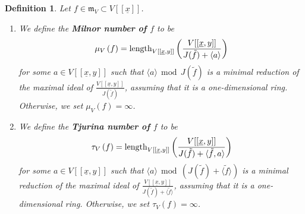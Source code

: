 \documentclass{article}
\newtheorem{definition}[theorem]{Definition}
\newcommand{\maxV}{\mathfrak{m}_V}
\newcommand{\Vx}{V[[\underline{x}]]}
\newcommand{\Vxy}{V[[\underline{x},y]]}
\numberwithin{theorem}{section}
\renewcommand{\mod}{\,\operatorname{mod}\,}
\begin{document}
\begin{definition}\label{def:tjurinaV}
    Let $f \in \maxV \subset \Vx$. 
    \begin{enumerate}
        \item We define the \textbf{Milnor number of $f$} to be
        \begin{equation*}
            \mu_V\left(f\right)=\textup{length}_{\Vxy}\left(\frac{\Vxy}{J(\tilde{f}) + \langle a \rangle}\right)
        \end{equation*}
        for some $a \in \Vxy$ such that $ \langle a\rangle \mod     J(\tilde{f})$ is a minimal reduction of the maximal ideal of $\frac{\Vxy}{J(\tilde{f})}$, assuming that it is a one-dimensional ring. Otherwise, we set $\mu_V\left(f\right)=\infty$. 
        \item We define the \textbf{Tjurina number of $f$} to be
        \begin{equation*}
            \tau_V\left(f\right)=\textup{length}_{\Vxy}\left(\frac{\Vxy}{J(\tilde{f}) + \langle \tilde{f},  a \rangle}\right)
        \end{equation*} for some $a \in \Vxy$ such that $\langle a \rangle  \mod    (J(\tilde{f}) + \langle \tilde{f} \rangle)$ is a minimal reduction of the maximal ideal of $\frac{\Vxy}{J(\tilde{f}) + \langle \tilde{f} \rangle}$, assuming that it is a one-dimensional ring. Otherwise, we set $\tau_V\left(f\right)=\infty$. 
    \end{enumerate}
\end{definition}
\end{document}
